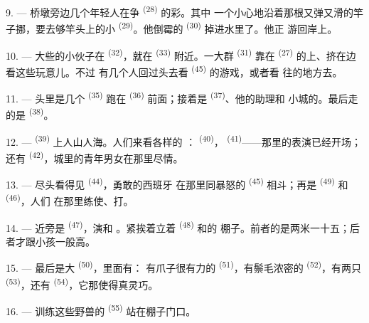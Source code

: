 9. --- 桥墩旁边几个年轻人在争 \textsuperscript{(28)} 的彩。其中
一个小心地沿着那根又弹又滑的竿子挪，要去够竿头上的小
\textsuperscript{(29)}。他倒霉的 \textsuperscript{(30)} 掉进水里了。他正
游回岸上。

10. --- 大些的小伙子在 \textsuperscript{(32)}，就在
\textsuperscript{(33)} 附近。一大群 \textsuperscript{(31)} 靠在
\textsuperscript{(27)} 的上、挤在边看这些玩意儿。不过
有几个人回过头去看 \textsuperscript{(45)} 的游戏，或者看
往的地方去。

11. --- 头里是几个 \textsuperscript{(35)} 跑在
\textsuperscript{(36)} 前面；接着是 \textsuperscript{(37)}、他的助理和
小城的。最后走的是 \textsuperscript{(38)}。

\VUsaut{5.0mm}
\VUsaut{3.6mm}

12. ---  \textsuperscript{(39)} 上人山人海。人们来看各样的
： \textsuperscript{(40)}，
\textsuperscript{(41)}——那里的表演已经开场；还有
\textsuperscript{(42)}，城里的青年男女在那里尽情。

13. --- 尽头看得见 \textsuperscript{(44)}，勇敢的西班牙
在那里同暴怒的 \textsuperscript{(45)} 相斗；再是
 \textsuperscript{(49)} 和 \textsuperscript{(46)}，人们
在那里练使、打。

14. --- 近旁是 \textsuperscript{(47)}，演和
。紧挨着立着 \textsuperscript{(48)} 和的
棚子。前者的是两米一十五；后者才跟小孩一般高。

15. --- 最后是大 \textsuperscript{(50)}，里面有：
有爪子很有力的 \textsuperscript{(51)}，有鬃毛浓密的
\textsuperscript{(52)}，有两只 \textsuperscript{(53)}，还有
\textsuperscript{(54)}，它那使得真灵巧。

16. --- 训练这些野兽的 \textsuperscript{(55)} 站在棚子门口。
\VUsaut{6.0mm}
\VUfilet{22mm}

